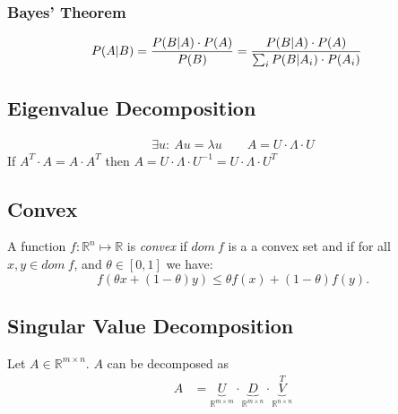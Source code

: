 \documentclass[a4paper,11pt,landscape]{article}
\newcommand{\R}{\mathbb{R}}
\begin{document}
\begin{multicols}{3}
\subsubsection{Bayes' Theorem}
\begin{align*}
 P(A|B) &= {P(B|A)\cdot P(A) \over P(B)} = {P(B|A) \cdot P(A) \over \sum_i P(B|A_i)\cdot P(A_i)}
\end{align*}
\belowdisplayskip=0pt

\subsection{Eigenvalue Decomposition}
\begin{align*}
 \exists u:\ A u = \lambda u \qquad A = U \cdot \Lambda \cdot U
\end{align*}
If $A^T\cdot A = A\cdot A^T$ then $A = U\cdot\Lambda\cdot U^{-1} =U\cdot\Lambda\cdot U^{T}$


\subsection{Convex}
A function $f:\R^n \mapsto \R$ is \emph{convex} if $dom\ f$ is a a convex set and if for all $x,y \in dom\ f$, and $\theta \in [0,1]$ we have:
\[
 f(\theta x +(1-\theta )y)\leq \theta f(x)+(1-\theta) f(y).
\]

\subsection{Singular Value Decomposition}
Let $A \in \R^{m\times n}$. $A$ can be decomposed as
\begin{align*}
 A &= \underbrace{U}_{\R^{m\times m}}\cdot \underbrace{D}_{\R^{m\times n}}\cdot \underbrace{V}_{\R^{n\times n}}^T
\end{align*}


\end{multicols}
\end{document}
